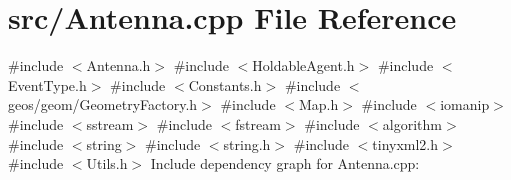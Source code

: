 \section{src/\+Antenna.cpp File Reference}
\label{_antenna_8cpp}
{\ttfamily \#include $<$Antenna.\+h$>$}\newline
{\ttfamily \#include $<$Holdable\+Agent.\+h$>$}\newline
{\ttfamily \#include $<$Event\+Type.\+h$>$}\newline
{\ttfamily \#include $<$Constants.\+h$>$}\newline
{\ttfamily \#include $<$geos/geom/\+Geometry\+Factory.\+h$>$}\newline
{\ttfamily \#include $<$Map.\+h$>$}\newline
{\ttfamily \#include $<$iomanip$>$}\newline
{\ttfamily \#include $<$sstream$>$}\newline
{\ttfamily \#include $<$fstream$>$}\newline
{\ttfamily \#include $<$algorithm$>$}\newline
{\ttfamily \#include $<$string$>$}\newline
{\ttfamily \#include $<$string.\+h$>$}\newline
{\ttfamily \#include $<$tinyxml2.\+h$>$}\newline
{\ttfamily \#include $<$Utils.\+h$>$}\newline
Include dependency graph for Antenna.\+cpp\+:
